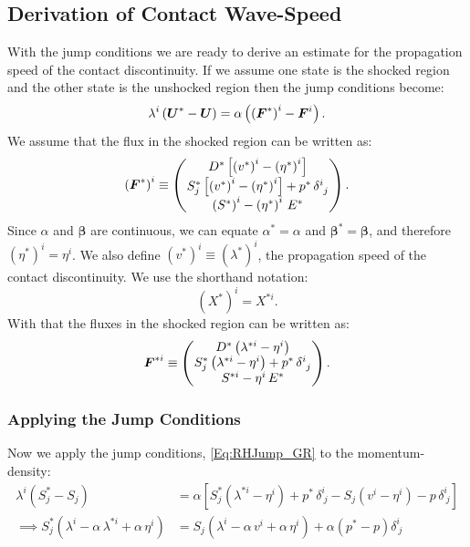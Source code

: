 \documentclass[10pt,preprint]{../aastex}
\begin{document}
\subsection{Derivation of Contact Wave-Speed}
With the jump conditions we are ready to derive an estimate for the propagation speed of the contact discontinuity. If we assume one state is the shocked region and the other state is the unshocked region then the jump conditions become:
\begin{equation}\label{Eq:RHJump_GR}
    \lambda^{i}\left(\boldsymbol{U}^{*}-\boldsymbol{U}\right)=\alpha\left(\left(\boldsymbol{F}^{*}\right)^{i}-\boldsymbol{F}^{i}\right).
\end{equation}
We assume that the flux in the shocked region can be written as:
\begin{equation}
    \left(\boldsymbol{F}^{*}\right)^{i}\equiv
    \begin{pmatrix}
      D^{*}\left[\left(v^{*}\right)^{i}-\left(\eta^{*}\right)^{i}\right] \\
      S^{*}_{j}\left[\left(v^{*}\right)^{i}-\left(\eta^{*}\right)^{i}\right] + p^{*}\,\delta^{i}_{~j} \\
      \left(S^{*}\right)^{i}-\left(\eta^{*}\right)^{i}\,E^{*}
    \end{pmatrix}.
\end{equation}
Since $\alpha$ and $\boldsymbol{\beta}$ are continuous, we can equate $\alpha^{*}=\alpha$ and $\boldsymbol{\beta}^{*}=\boldsymbol{\beta}$, and therefore $\left(\eta^{*}\right)^{i}=\eta^{i}$. We also define $\left(v^{*}\right)^{i}\equiv\left(\lambda^{*}\right)^{i}$, the propagation speed of the contact discontinuity. We use the shorthand notation:
\begin{equation}
    \left(X^{*}\right)^{i}=X^{*i}.
\end{equation}
With that the fluxes in the shocked region can be written as:
\begin{equation}\label{Eq:StarFlux}
    \boldsymbol{F}^{*i}\equiv
    \begin{pmatrix}
      D^{*}\left(\lambda^{*i}-\eta^{i}\right) \\
      S^{*}_{j}\left(\lambda^{*i}-\eta^{i}\right) + p^{*}\,\delta^{i}_{~j} \\
      S^{*i}-\eta^{i}\,E^{*}
    \end{pmatrix}.
\end{equation}

\subsubsection{Applying the Jump Conditions}
Now we apply the jump conditions, \eqref{Eq:RHJump_GR} to the momentum-density:
\begin{align}
    \lambda^{i}\left(S^{*}_{j}-S_{j}\right)&=\alpha\left[S^{*}_{j}\left(\lambda^{*i}-\eta^{i}\right)+p^{*}\,\delta^{i}_{~j}-S_{j}\left(v^{i}-\eta^{i}\right)-p\,\delta^{i}_{~j}\right]\\
    \implies S^{*}_{j}\left(\lambda^{i}-\alpha\,\lambda^{*i}+\alpha\,\eta^{i}\right)&=S_{j}\left(\lambda^{i}-\alpha\,v^{i}+\alpha\,\eta^{i}\right)+\alpha\left(p^{*}-p\right)\delta^{i}_{~j}\label{Eq:RH_Mom}
\end{align}
\end{document}
